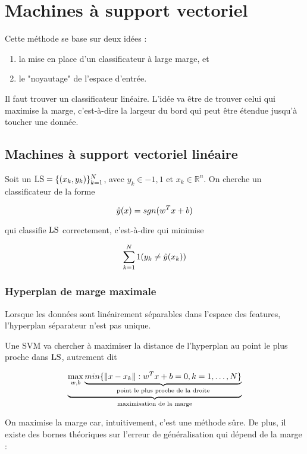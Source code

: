 \chapter{Machines à support vectoriel}

Cette méthode se base sur deux idées :

\begin{enumerate}
	\item la mise en place d'un classificateur à large marge, et
	\item le "noyautage" de l'espace d'entrée.
\end{enumerate}

Il faut trouver un classificateur linéaire. L'idée va être de trouver celui qui maximise la marge, c'est-à-dire la largeur du bord qui peut être étendue jusqu'à toucher une donnée.


\section{Machines à support vectoriel linéaire}
	
	Soit un $\text{LS} = \lbrace (x_k, y_k) \rbrace^N_{k = 1}$, avec $y_k \in {-1, 1}$ et $x_k \in \mathbb{R}^n$. On cherche un classificateur de la forme
	
	$$\hat{y}(x) = sgn(w^T x + b)$$
	
	qui classifie $\text{LS}$ correctement, c'est-à-dire qui minimise
	
	$$\sum_{k = 1}^N1(y_k \neq \hat{y}(x_k))$$
	
	
	\subsection{Hyperplan de marge maximale}
	
	Lorsque les données sont linéairement séparables dans l'espace des features, l'hyperplan séparateur n'est pas unique.
	
	
	Une SVM va chercher à maximiser la distance de l'hyperplan au point le plus proche dans $\text{LS}$, autrement dit
	
	$$\underbrace{\max_{w, b} \underbrace{min \lbrace \Vert x - x_k \Vert : w^T x + b = 0, k = 1, \dots , N \rbrace}_{\text{point le plus proche de la droite}}}_{\text{maximisation de la marge}}$$
	
	On maximise la marge car, intuitivement, c'est une méthode sûre. De plus, il existe des bornes théoriques sur l'erreur de généralisation qui dépend de la marge :
	

